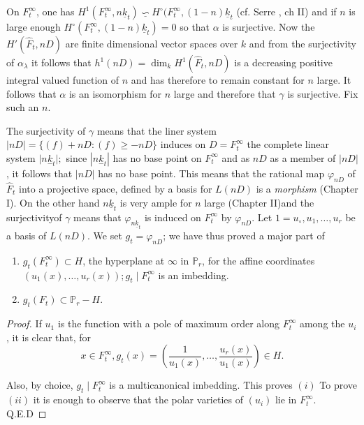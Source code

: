 On $F^{\infty}_{t}$, one has  $H^{1}(F^{\infty}_{t},
n\underline{k}_{t}) \underline{\backsim} H^{\circ}(F^{\infty}_{t},
(1-n) \underline{k}_{t}$ (cf. Serre \cite{7}, ch II) and if $n$ is large
enough $H^{\circ}(F^{\infty}_{t},(1-n) \underline{k}_{t}) = 0$ so that
$\alpha$ is surjective. Now the $H'(\hat{F}_{t}, nD)$ are finite
dimensional vector spaces over $k$ and from the surjectivity of $
\alpha_\lambda$ it follows that $ h^1(nD) = \dim_{k} H^{1}
(\hat{F}_{t}, nD)$ is a decreasing positive integral valued
function of $n$ and has therefore to remain constant for $n$ large. It
follows that $\alpha$ is an isomorphism for $n$ large and therefore
that $\gamma$ is surjective. Fix such an $n$. 

The surjectivity of $\gamma$ means that the liner system $\mid nD \mid
= \{(f) + nD : (f) \geq - nD\}$ induces on $D = F^{\infty}_{t}$ the
complete linear system $\mid n \underset{-}k_t |;$ since
$|n\underset{-}k_t|$ has no base point on $F^{\infty}_t$ and as $nD$
as a member of $|nD|$, it follows that $|nD|$ has no base point. This
means that the rational map $\varphi_{nD}$ of $\hat{F}_t$ into a
projective space, defined by a basis for $L(nD)$ is a \textit{
  morphism } (Chapter I). On the other hand $n \underline{k}_{t}$ is
very ample for $n$ large (Chapter II)and the  surjectivity\pageoriginale of
$\gamma$ means that $\varphi_{n\underline{k}_{t}}$ is induced on
$F^{\infty}_{t}$ by $ \varphi_{nD}$. Let $1 = u_{\circ}, u_{1}, \ldots
, u_{r}$ be a basis of $L(nD)$. We set $g_t = \varphi_{nD}$; we have
thus proved a major part of 

\setcounter{lemma}{0}
\begin{lemma}\label{chap3:sec2:lem1}%
  \begin{enumerate}[\rm (i)]
  \item $ g_{t}(F_{t}^{\infty})\subset H$, the hyperplane at $\infty$
    in $\mathbb{P}_{r}$, for the affine coordinates $ (u_{1}(x),
    \ldots , u_r(x)); g_t \mid F^{\infty}_t$ is an imbedding.  
  \item  $g_t(F_t)\subset \mathbb{P}_r - H$.
  \end{enumerate}
\end{lemma}
 
\begin{proof}%
  If $ u_1$ is the function with a pole of maximum order along $
  F^\infty_t$ among the $ u_i$, it is clear that, for 
  $$ 
  x \in F^\infty_t, g_t(x) = \left(\dfrac{1}{u_1(x)}, \ldots
  ,\dfrac{u_r(x)}{u_1(x)}\right) \in H.
  $$

  Also, by choice, $ g_t\mid
  F^\infty_t$ is a multicanonical imbedding. This proves $(i)$ To
  prove $(ii)$ it is enough to observe that the polar varieties of
  $(u_i)$ lie in $F^\infty_t$. \phantom{WWWWWWWWWWWWWWWWWWWw}\hfill {Q.E.D}
\end{proof}

